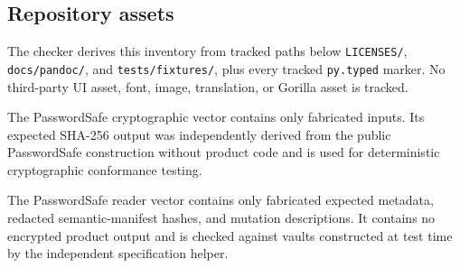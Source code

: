 \documentclass[
  letterpaper,
]{article}
\newcommand{\passthrough}[1]{#1}
\begin{document}
\begin{landscape}

\subsection{Repository assets}\label{repository-assets}

The checker derives this inventory from tracked paths below \passthrough{\lstinline!LICENSES/!},
\nolinkurl{docs/pandoc/}, and \nolinkurl{tests/fixtures/}, plus every tracked \passthrough{\lstinline!py.typed!} marker.
No third-party UI asset, font, image, translation, or Gorilla asset is tracked.

The PasswordSafe cryptographic vector contains only fabricated inputs. Its expected SHA-256 output was independently
derived from the public PasswordSafe construction without product code and is used for deterministic cryptographic
conformance testing.

The PasswordSafe reader vector contains only fabricated expected metadata, redacted semantic-manifest hashes, and
mutation descriptions. It contains no encrypted product output and is checked against vaults constructed at test time by
the independent specification helper.


\end{landscape}
\end{document}
